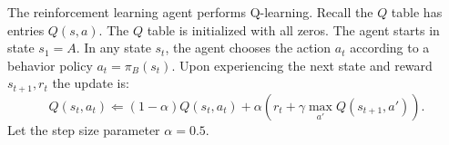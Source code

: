 \documentclass[a4paper]{article}
\theoremstyle{definition}
\begin{document}

The reinforcement learning agent performs Q-learning.  Recall the $Q$ table has entries $Q(s,a)$. The $Q$ table is initialized with all zeros. The agent starts in state $s_1=A$. In any state $s_t$, the agent chooses the action $a_t$ according to a behavior policy $a_t = \pi_B(s_t)$. Upon experiencing the next state and reward $s_{t+1}, r_t$ the update is:
$$Q(s_t, a_t) \Leftarrow (1-\alpha) Q(s_t, a_t) + \alpha \left( r_t + \gamma \max_{a'} Q(s_{t+1}, a') \right).$$
Let the step size parameter $\alpha=0.5$.
\end{document}
